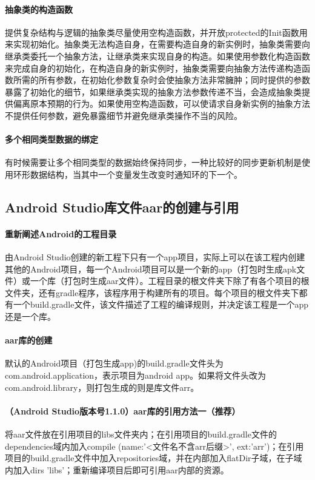 \documentclass[UTF8]{ctexart}
\begin{document}
    \paragraph{抽象类的构造函数}
    提供复杂结构与逻辑的抽象类尽量使用空构造函数，并开放protected的Init函数用来实现初始化。抽象类无法构造自身，在需要构造自身的新实例时，抽象类需要向继承类委托一个抽象方法，让继承类来实现自身的构造。如果使用参数化构造函数来完成自身的初始化，在构造自身的新实例时，抽象类需要向抽象方法传递构造函数所需的所有参数，在初始化参数复杂时会使抽象方法非常臃肿；同时提供的参数暴露了初始化的细节，如果继承类实现的抽象方法参数传递不当，会造成抽象类提供偏离原本预期的行为。如果使用空构造函数，可以使请求自身新实例的抽象方法不提供任何参数，避免暴露细节并避免继承类操作不当的风险。
    \paragraph{多个相同类型数据的绑定}
    有时候需要让多个相同类型的数据始终保持同步，一种比较好的同步更新机制是使用环形数据结构，当其中一个变量发生改变时通知环的下一个。
    \subsection{Android Studio库文件aar的创建与引用}
    \paragraph{重新阐述Android的工程目录}
    由Android Studio创建的新工程下只有一个app项目，实际上可以在该工程内创建其他的Android项目，每一个Android项目可以是一个新的app（打包时生成apk文件）或一个库（打包时生成aar文件）。工程目录的根文件夹下除了有各个项目的根文件夹，还有gradle程序，该程序用于构建所有的项目。每个项目的根文件夹下都有一个build.gradle文件，该文件描述了工程的编译规则，并决定该工程是一个app还是一个库。
    \paragraph{aar库的创建}
    默认的Android项目（打包生成app)的build.gradle文件头为com.android.application，表示项目为android app。如果将文件头改为com.android.library，则打包生成的则是库文件arr。
    \paragraph{（Android Studio版本号1.1.0）aar库的引用方法一（推荐）}
    将aar文件放在引用项目的libs文件夹内；在引用项目的build.gradle文件的dependencies域内加入compile (name:'<文件名不含arr后缀>', ext:'arr')；在引用项目的build.gradle文件中加入repositories域，并在内部加入flatDir子域，在子域内加入dirs 'libs'；重新编译项目后即可引用aar内部的资源。
\end{document}
